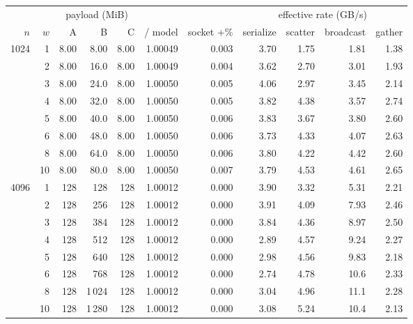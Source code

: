 \begin{tabular}{rrrrrrrrrrr}
\toprule
 & & \multicolumn{3}{c}{payload (MiB)} & & & \multicolumn{4}{c}{effective rate (GB/s)} \\ \cmidrule(lr){3-5} \cmidrule(lr){8-11} $n$ & $w$ & A & B & C & / model & socket +\% & serialize & scatter & broadcast & gather \\
\midrule
1024 & 1 & 8.00 & 8.00 & 8.00 & 1.00049 & 0.003 & 3.70 & 1.75 & 1.81 & 1.38 \\
 & 2 & 8.00 & 16.0 & 8.00 & 1.00049 & 0.004 & 3.62 & 2.70 & 3.01 & 1.93 \\
 & 3 & 8.00 & 24.0 & 8.00 & 1.00050 & 0.005 & 4.06 & 2.97 & 3.45 & 2.14 \\
 & 4 & 8.00 & 32.0 & 8.00 & 1.00050 & 0.005 & 3.82 & 4.38 & 3.57 & 2.74 \\
 & 5 & 8.00 & 40.0 & 8.00 & 1.00050 & 0.006 & 3.83 & 3.67 & 3.80 & 2.60 \\
 & 6 & 8.00 & 48.0 & 8.00 & 1.00050 & 0.006 & 3.73 & 4.33 & 4.07 & 2.63 \\
 & 8 & 8.00 & 64.0 & 8.00 & 1.00050 & 0.006 & 3.80 & 4.22 & 4.42 & 2.60 \\
 & 10 & 8.00 & 80.0 & 8.00 & 1.00050 & 0.007 & 3.79 & 4.53 & 4.61 & 2.65 \\
\midrule
4096 & 1 & 128 & 128 & 128 & 1.00012 & 0.000 & 3.90 & 3.32 & 5.31 & 2.21 \\
 & 2 & 128 & 256 & 128 & 1.00012 & 0.000 & 3.91 & 4.09 & 7.93 & 2.46 \\
 & 3 & 128 & 384 & 128 & 1.00012 & 0.000 & 3.84 & 4.36 & 8.97 & 2.50 \\
 & 4 & 128 & 512 & 128 & 1.00012 & 0.000 & 2.89 & 4.57 & 9.24 & 2.27 \\
 & 5 & 128 & 640 & 128 & 1.00012 & 0.000 & 2.98 & 4.56 & 9.83 & 2.18 \\
 & 6 & 128 & 768 & 128 & 1.00012 & 0.000 & 2.74 & 4.78 & 10.6 & 2.33 \\
 & 8 & 128 & 1\,024 & 128 & 1.00012 & 0.000 & 3.04 & 4.96 & 11.1 & 2.28 \\
 & 10 & 128 & 1\,280 & 128 & 1.00012 & 0.000 & 3.08 & 5.24 & 10.4 & 2.13 \\
\bottomrule
\end{tabular}
\par{}
